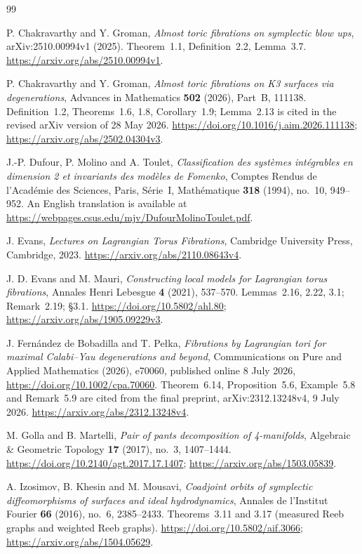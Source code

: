 \begin{thebibliography}{99}

P. Chakravarthy and Y. Groman,
\emph{Almost toric fibrations on symplectic blow ups},
arXiv:2510.00994v1 (2025).
Theorem~1.1, Definition~2.2, Lemma~3.7.
\url{https://arxiv.org/abs/2510.00994v1}.

P. Chakravarthy and Y. Groman,
\emph{Almost toric fibrations on K3 surfaces via degenerations},
Advances in Mathematics \textbf{502} (2026), Part~B, 111138.
Definition~1.2, Theorems~1.6, 1.8, Corollary~1.9;
Lemma~2.13 is cited in the revised arXiv version of 28 May 2026.
\url{https://doi.org/10.1016/j.aim.2026.111138};
\url{https://arxiv.org/abs/2502.04304v3}.

J.-P. Dufour, P. Molino and A. Toulet,
\emph{Classification des systèmes intégrables en dimension 2 et invariants des modèles de Fomenko},
Comptes Rendus de l'Académie des Sciences, Paris, Série~I, Mathématique
\textbf{318} (1994), no.~10, 949--952.
An English translation is available at
\url{https://webpages.csus.edu/mjv/DufourMolinoToulet.pdf}.

J. Evans,
\emph{Lectures on Lagrangian Torus Fibrations},
Cambridge University Press, Cambridge, 2023.
\url{https://arxiv.org/abs/2110.08643v4}.

J. D. Evans and M. Mauri,
\emph{Constructing local models for Lagrangian torus fibrations},
Annales Henri Lebesgue \textbf{4} (2021), 537--570.
Lemmas~2.16, 2.22, 3.1; Remark~2.19; \S3.1.
\url{https://doi.org/10.5802/ahl.80};
\url{https://arxiv.org/abs/1905.09229v3}.

J. Fernández de Bobadilla and T. Pełka,
\emph{Fibrations by Lagrangian tori for maximal Calabi--Yau degenerations and beyond},
Communications on Pure and Applied Mathematics (2026), e70060,
published online 8 July 2026,
\url{https://doi.org/10.1002/cpa.70060}.
Theorem~6.14, Proposition~5.6, Example~5.8 and Remark~5.9 are cited from the final preprint,
arXiv:2312.13248v4, 9 July 2026.
\url{https://arxiv.org/abs/2312.13248v4}.

M. Golla and B. Martelli,
\emph{Pair of pants decomposition of 4-manifolds},
Algebraic \& Geometric Topology \textbf{17} (2017), no.~3, 1407--1444.
\url{https://doi.org/10.2140/agt.2017.17.1407};
\url{https://arxiv.org/abs/1503.05839}.

A. Izosimov, B. Khesin and M. Mousavi,
\emph{Coadjoint orbits of symplectic diffeomorphisms of surfaces and ideal hydrodynamics},
Annales de l'Institut Fourier \textbf{66} (2016), no.~6, 2385--2433.
Theorems~3.11 and 3.17 (measured Reeb graphs and weighted Reeb graphs).
\url{https://doi.org/10.5802/aif.3066};
\url{https://arxiv.org/abs/1504.05629}.


\end{thebibliography}
